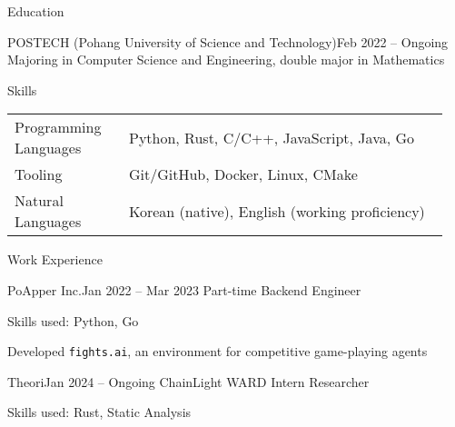 \documentclass{resume}
\begin{document}
\begin{res-section}{Education}
  \begin{res-subsection}{POSTECH (Pohang University of Science and Technology)}{Feb 2022 -- Ongoing}
    Majoring in Computer Science and Engineering, double major in Mathematics
  \end{res-subsection}
\end{res-section}

\begin{res-section}{Skills}
  \begin{tabular}{p{0.25\linewidth}p{0.7\linewidth}}
    Programming Languages
      & Python, Rust, C/C++, JavaScript, Java, Go \\
    Tooling
      & Git/GitHub, Docker, Linux, CMake \\
    Natural Languages
      & Korean (native), English (working proficiency)
  \end{tabular}
\end{res-section}

\begin{res-section}{Work Experience}
  \begin{res-subsection}{PoApper Inc.}{Jan 2022 -- Mar 2023}
    Part-time Backend Engineer

    \item Skills used: Python, Go

    \item Developed \texttt{fights.ai}, an environment for competitive game-playing agents
  \end{res-subsection}

  \begin{res-subsection}{Theori}{Jan 2024 -- Ongoing}
    ChainLight WARD Intern Researcher

    \item Skills used: Rust, Static Analysis
  \end{res-subsection}
\end{res-section}
\end{document}
